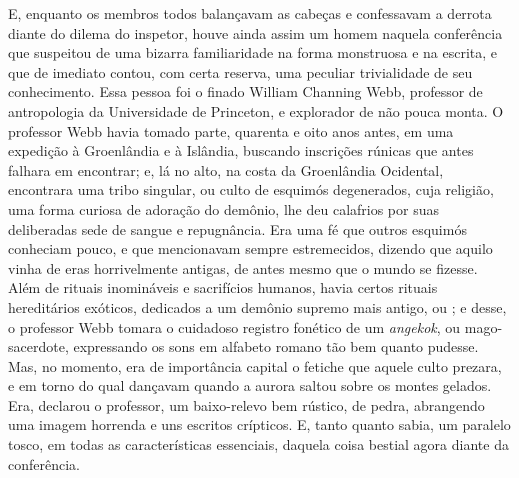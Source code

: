 \begin{pages}
\begin{Rightside}
E, enquanto os membros todos balançavam as cabeças e confessavam a
derrota diante do dilema do inspetor, houve ainda assim um homem naquela
conferência que suspeitou de uma bizarra familiaridade na forma
monstruosa e na escrita, e que de imediato contou, com certa reserva,
uma peculiar trivialidade de seu conhecimento. Essa pessoa foi o finado
William Channing Webb, professor de antropologia da Universidade de
Princeton, e explorador de não pouca monta. O professor Webb havia
tomado parte, quarenta e oito anos antes, em uma expedição à Groenlândia
e à Islândia, buscando inscrições rúnicas que antes falhara em
encontrar; e, lá no alto, na costa da Groenlândia Ocidental, encontrara
uma tribo singular, ou culto de esquimós degenerados, cuja religião, uma
forma curiosa de adoração do demônio, lhe deu calafrios por suas
deliberadas sede de sangue e repugnância. Era uma fé que outros esquimós
conheciam pouco, e que mencionavam sempre estremecidos, dizendo que
aquilo vinha de eras horrivelmente antigas, de antes mesmo que o mundo
se fizesse. Além de rituais inomináveis e sacrifícios humanos, havia
certos rituais hereditários exóticos, dedicados a um demônio supremo
mais antigo, ou ; e desse, o professor Webb
tomara o cuidadoso registro fonético de um \emph{angekok}, ou
mago-sacerdote, expressando os sons em alfabeto romano tão bem quanto
pudesse. Mas, no momento, era de importância capital o fetiche que
aquele culto prezara, e em torno do qual dançavam quando a aurora saltou
sobre os montes gelados. Era, declarou o professor, um baixo-relevo bem
rústico, de pedra, abrangendo uma imagem horrenda e uns escritos
crípticos. E, tanto quanto sabia, um paralelo tosco, em todas as
características essenciais, daquela coisa bestial agora diante da
conferência.


\end{Rightside}
\end{pages}
